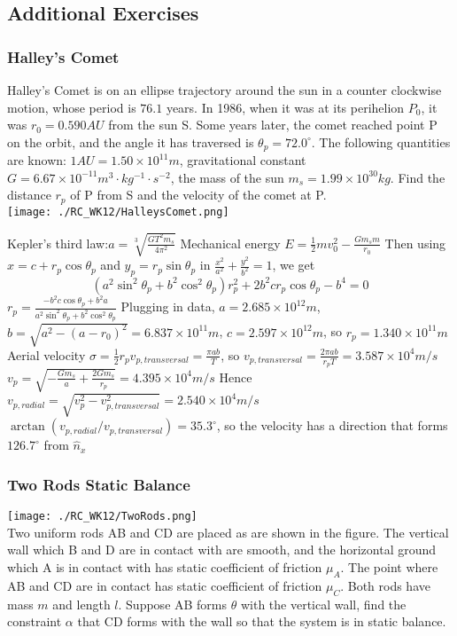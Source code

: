 \subsection{Additional Exercises}
\begin{frame}
\frametitle{Halley's Comet}
Halley's Comet is on an ellipse trajectory around the sun in a counter clockwise motion, whose period is $76.1$ years. In 1986, when it was at its perihelion $P_0$, it was $r_0=0.590\unit{AU}$ from the sun S. Some years later, the comet reached point P on the orbit, and the angle it has traversed is $\theta_p=72.0^\circ$. The following quantities are known: $1\unit{AU}=1.50\times 10^{11}\unit{m}$, gravitational constant $G=6.67\times 10^{-11}\unit{m^3\cdot kg^{-1}\cdot s^{-2}}$, the mass of the sun $m_s=1.99\times 10^{30}\unit{kg}$. Find the distance $r_p$ of P from S and the velocity of the comet at P.\\
\texttt{[image: ./RC\_WK12/HalleysComet.png]}
\end{frame}
\begin{frame}
Kepler's third law:$a=\sqrt[3]{\frac{GT^2m_s}{4\pi^2}}$
Mechanical energy $E=\frac{1}{2}mv_0^2-\frac{Gm_sm}{r_0}$
Then using $x=c+r_p\cos\theta_p$ and $y_p=r_p\sin\theta_p$ in $\frac{x^2}{a^2}+\frac{y^2}{b^2}=1$, we get
\[(a^2\sin^2\theta_p+b^2\cos^2\theta_p)r_p^2+2b^2c r_p\cos\theta_p-b^4=0\]
$r_p=\frac{-b^2c\cos\theta_p+b^2a}{a^2\sin^2\theta_p+b^2\cos^2\theta_p}$
Plugging in data, $a=2.685\times 10^{12}\unit{m}$, $b=\sqrt{a^2-(a-r_0)^2}=6.837\times 10^{11}\unit{m}$, $c=2.597\times 10^{12}\unit{m}$, so $r_p=1.340\times 10^{11}\unit{m}$\\
Aerial velocity $\sigma=\frac{1}{2}r_pv_{p,transversal}=\frac{\pi a b}{T}$, so $v_{p,transversal}=\frac{2\pi a b}{r_pT}=3.587\times 10^4\unit{m/s}$
$v_p=\sqrt{-\frac{Gm_s}{a}+\frac{2Gm_s}{r_p}}=4.395\times 10^4\unit{m/s}$
Hence $v_{p,radial}=\sqrt{v_{p}^2-v_{p,transversal}^2}=2.540\times 10^4\unit{m/s}$
$\arctan(v_{p,radial}/v_{p,transversal})=35.3^\circ$, so the velocity has a direction that forms $126.7^\circ$ from $\hat n_x$
\end{frame}
\begin{frame}
\frametitle{Two Rods Static Balance}
\begin{multicols}{2}
\texttt{[image: ./RC\_WK12/TwoRods.png]}\\
Two uniform rods AB and CD are placed as are shown in the figure. The vertical wall which B and D are in contact with are smooth, and the horizontal ground which A is in contact with has static coefficient of friction $\mu_A$. The point where AB and CD are in contact has static coefficient of friction $\mu_C$. Both rods have mass $m$ and length $l$. Suppose AB forms $\theta$ with the vertical wall, find the constraint $\alpha$ that CD forms with the wall so that the system is in static balance.
\end{multicols}
\end{frame}
